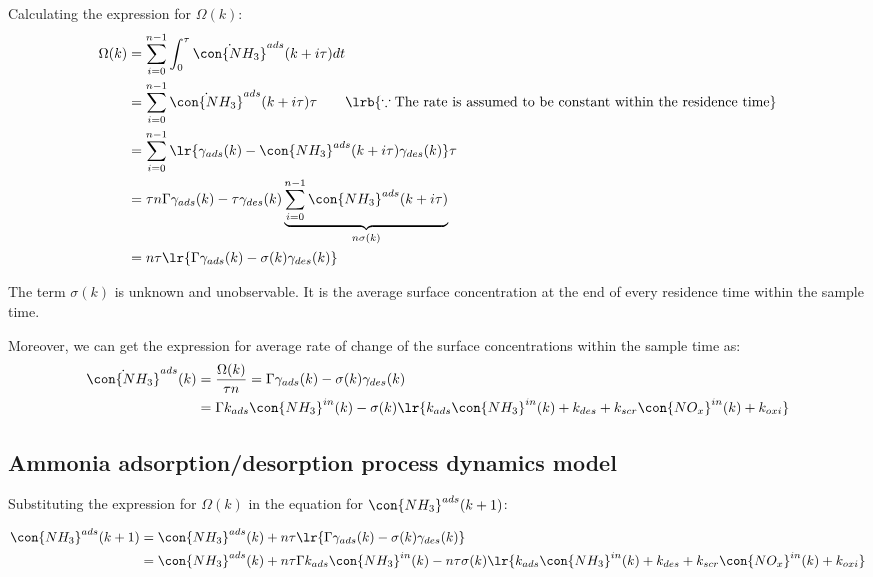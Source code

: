 Calculating the expression for $\Omega(k)$:
\begin{align*}
    \Omega(k) &= \sum_{i=0}^{n-1} \int_{0}^{\tau} \dot{\con{NH_3}}^{ads} (k + i\tau) dt\\
    &= \sum_{i=0}^{n-1} \dot{\con{NH_3}}^{ads} (k + i\tau) \tau \qquad \lrb{\because \text{The rate is assumed to be constant within the residence time}}\\
    &= \sum_{i=0}^{n-1} \lr{\gamma_{ads} (k) - \con{NH_3}^{ads} (k + i \tau) \gamma_{des} (k)} \tau\\
    &= \tau n \Gamma \gamma_{ads} (k) - \tau \gamma_{des} (k) \underbrace{\sum_{i=0}^{n-1} \con{NH_3}^{ads} (k + i \tau) }_{n \sigma(k)} \\
    &= n \tau \lr{\Gamma \gamma_{ads} (k) - \sigma(k) \gamma_{des} (k)}
\end{align*}

The term $\sigma(k)$ is unknown and unobservable. It is the average surface
concentration at the end of every residence time within the sample time.

Moreover, we can get the expression for average rate of change of the surface
concentrations within the sample time as:
\begin{align*}
    \dot{\con{NH_3}}^{ads} (k) &= \frac{\Omega(k)}{\tau n} = \Gamma \gamma_{ads} (k) - \sigma(k) \gamma_{des} (k)\\
    &= \Gamma k_{ads} \con{NH_3}^{in}(k) - \sigma(k) \lr{k_{ads} \con{NH_3}^{in}(k) + k_{des} + k_{scr} \con{NO_x}^{in}(k) + k_{oxi}}
\end{align*}


\subsection{Ammonia adsorption/desorption process dynamics model}
Substituting the expression for $\Omega(k)$ in the equation for
$\con{NH_3}^{ads}(k + 1)$:

\begin{align*}
    \con{NH_3}^{ads}(k + 1) &= \con{NH_3}^{ads} (k) + n \tau \lr{\Gamma \gamma_{ads} (k) - \sigma(k) \gamma_{des} (k)}\\
    &= \con{NH_3}^{ads}(k) + n \tau \Gamma k_{ads} \con{NH_3}^{in}(k) - n \tau \sigma(k) \lr{k_{ads} \con{NH_3}^{in}(k) + k_{des} + k_{scr} \con{NO_x}^{in}(k) + k_{oxi}}
\end{align*}


